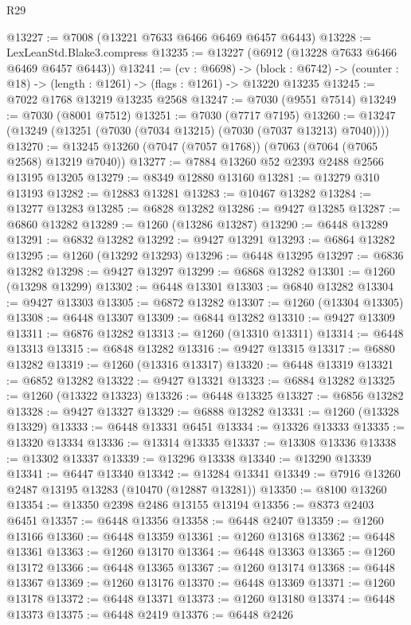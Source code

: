 \begin{lexlean}{R29}
\begin{coremodule}
@13227 := @7008 (@13221 @7633 @6466 @6469 @6457 @6443)
@13228 := LexLeanStd.Blake3.compress
@13235 := @13227 (@6912 (@13228 @7633 @6466 @6469 @6457 @6443))
@13241 := (cv : @6698) ->
  (block : @6742) -> (counter : @18) -> (length : @1261) -> (flags : @1261) -> @13220 @13235
@13245 := @7022 @1768 @13219 @13235 @2568
@13247 := @7030 (@9551 @7514)
@13249 := @7030 (@8001 @7512)
@13251 := @7030 (@7717 @7195)
@13260 := @13247 (@13249 (@13251 (@7030 (@7034 @13215) (@7030 (@7037 @13213) @7040))))
@13270 := @13245 @13260 (@7047 (@7057 @1768)) (@7063 (@7064 (@7065 @2568) @13219 @7040))
@13277 := @7884 @13260 @52 @2393 @2488 @2566 @13195 @13205
@13279 := @8349 @12880 @13160
@13281 := @13279 @310 @13193
@13282 := @12883 @13281
@13283 := @10467 @13282
@13284 := @13277 @13283
@13285 := @6828 @13282
@13286 := @9427 @13285
@13287 := @6860 @13282
@13289 := @1260 (@13286 @13287)
@13290 := @6448 @13289
@13291 := @6832 @13282
@13292 := @9427 @13291
@13293 := @6864 @13282
@13295 := @1260 (@13292 @13293)
@13296 := @6448 @13295
@13297 := @6836 @13282
@13298 := @9427 @13297
@13299 := @6868 @13282
@13301 := @1260 (@13298 @13299)
@13302 := @6448 @13301
@13303 := @6840 @13282
@13304 := @9427 @13303
@13305 := @6872 @13282
@13307 := @1260 (@13304 @13305)
@13308 := @6448 @13307
@13309 := @6844 @13282
@13310 := @9427 @13309
@13311 := @6876 @13282
@13313 := @1260 (@13310 @13311)
@13314 := @6448 @13313
@13315 := @6848 @13282
@13316 := @9427 @13315
@13317 := @6880 @13282
@13319 := @1260 (@13316 @13317)
@13320 := @6448 @13319
@13321 := @6852 @13282
@13322 := @9427 @13321
@13323 := @6884 @13282
@13325 := @1260 (@13322 @13323)
@13326 := @6448 @13325
@13327 := @6856 @13282
@13328 := @9427 @13327
@13329 := @6888 @13282
@13331 := @1260 (@13328 @13329)
@13333 := @6448 @13331 @6451
@13334 := @13326 @13333
@13335 := @13320 @13334
@13336 := @13314 @13335
@13337 := @13308 @13336
@13338 := @13302 @13337
@13339 := @13296 @13338
@13340 := @13290 @13339
@13341 := @6447 @13340
@13342 := @13284 @13341
@13349 := @7916 @13260 @2487 @13195 @13283 (@10470 (@12887 @13281))
@13350 := @8100 @13260
@13354 := @13350 @2398 @2486 @13155 @13194
@13356 := @8373 @2403 @6451
@13357 := @6448 @13356
@13358 := @6448 @2407
@13359 := @1260 @13166
@13360 := @6448 @13359
@13361 := @1260 @13168
@13362 := @6448 @13361
@13363 := @1260 @13170
@13364 := @6448 @13363
@13365 := @1260 @13172
@13366 := @6448 @13365
@13367 := @1260 @13174
@13368 := @6448 @13367
@13369 := @1260 @13176
@13370 := @6448 @13369
@13371 := @1260 @13178
@13372 := @6448 @13371
@13373 := @1260 @13180
@13374 := @6448 @13373
@13375 := @6448 @2419
@13376 := @6448 @2426

\end{coremodule}
\end{lexlean}
